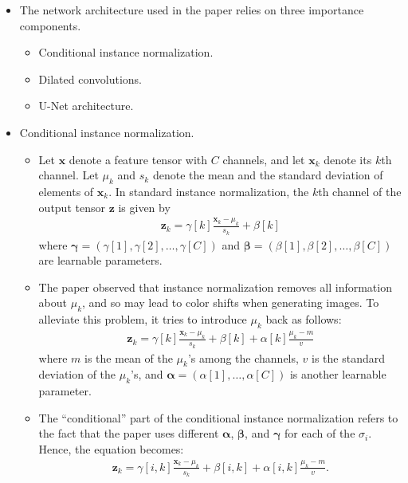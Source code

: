 \documentclass[10pt]{article}
\newcommand{\ve}[1]{\mathbf{#1}}
\newcommand{\ves}[1]{\boldsymbol{#1}}
\begin{document}
\begin{itemize}
  \item The network architecture used in the paper relies on three importance components.
  \begin{itemize}
    \item Conditional instance normalization.
    \item Dilated convolutions.
    \item U-Net architecture.
  \end{itemize}

  \item Conditional instance normalization.
  \begin{itemize}
    \item Let $\ve{x}$ denote a feature tensor with $C$ channels, and let $\ve{x}_k$ denote its $k$th channel. Let $\mu_k$ and $s_k$ denote the mean and the standard deviation of elements of $\ve{x}_k$. In standard instance normalization, the $k$th channel of the output tensor $\ve{z}$ is given by
    \begin{align*}
      \ve{z}_k = \gamma[k] \frac{\ve{x}_k - \mu_k}{s_k} + \beta[k]
    \end{align*}
    where $\ves{\gamma} = (\gamma[1],\gamma[2], \dotsc, \gamma[C])$ and $\ves{\beta} = (\beta[1], \beta[2], \dotsc, \beta[C])$ are learnable parameters.

    \item The paper observed that instance normalization removes all information about $\mu_k$, and so may lead to color shifts when generating images. To alleviate this problem, it tries to introduce $\mu_k$ back as follows:
    \begin{align*}
      \ve{z}_k = \gamma[k] \frac{\ve{x}_k - \mu_k}{s_k} + \beta[k] + \alpha[k] \frac{\mu_k - m}{v}
    \end{align*}
    where $m$ is the mean of the $\mu_k$'s among the channels, $v$ is the standard deviation of the $\mu_k$'s, and $\ves{\alpha} = (\alpha[1],\dotsc,\alpha[C])$ is another learnable parameter.

    \item The ``conditional'' part of the conditional instance normalization refers to the fact that the paper uses different $\ves{\alpha}$, $\ves{\beta}$, and $\ves{\gamma}$ for each of the $\sigma_i$. Hence, the equation becomes:
    \begin{align*}
      \ve{z}_k = \gamma[i,k] \frac{\ve{x}_k - \mu_k}{s_k} + \beta[i,k] + \alpha[i,k] \frac{\mu_k - m}{v}.
    \end{align*}
  \end{itemize}  
  

\end{itemize}
\end{document}
